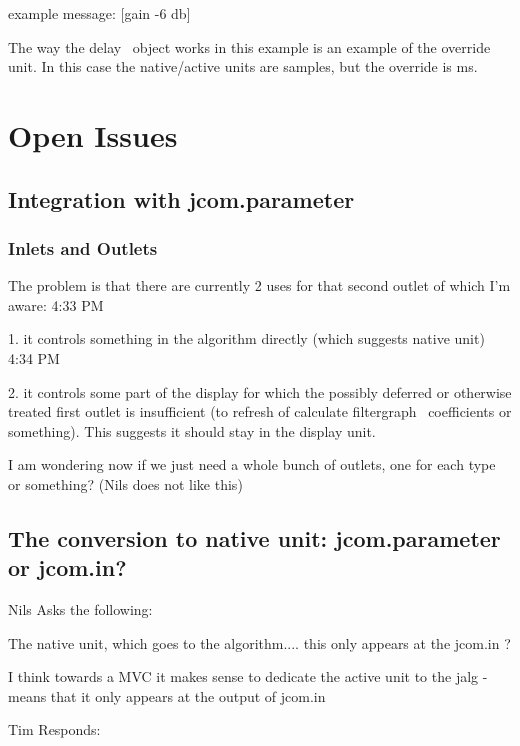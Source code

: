 \documentclass[]{article}
\begin{document}
example message:     [gain -6 db]

The way the delay~ object works in this example is an example of the override unit.  In this case the native/active units are samples, but the override is ms.






\section{Open Issues}

\subsection{Integration with jcom.parameter}

\subsubsection{Inlets and Outlets}

The problem is that there are currently 2 uses for that second outlet of which I'm aware:
4:33 PM
 
1. it controls something in the algorithm directly (which suggests native unit)
4:34 PM
 
2. it controls some part of the display for which the possibly deferred or otherwise treated first outlet is insufficient (to refresh of calculate filtergraph~ coefficients or something).  This suggests it should stay in the display unit.


 I am wondering now if we just need a whole bunch of outlets, one for each type or something?  (Nils does not like this)




\subsection{The conversion to native unit: jcom.parameter or jcom.in?}

Nils Asks the following:

The native unit, which goes to the algorithm....  this only appears at the jcom.in ?

I think towards a MVC it makes sense to dedicate the active unit to the jalg - means that it only appears at the output of jcom.in


Tim Responds:
\end{document}
